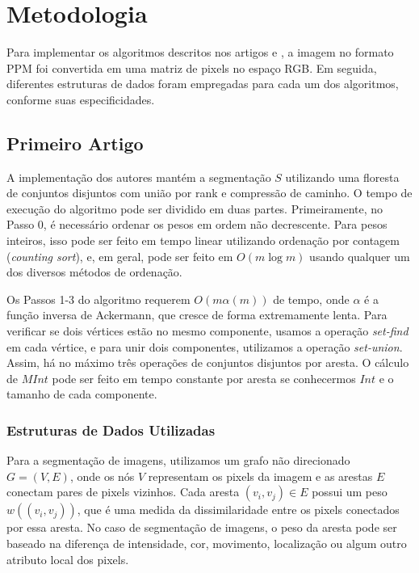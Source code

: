 \documentclass[12pt]{article}
\begin{document}
\section{Metodologia}
Para implementar os algoritmos descritos nos artigos \cite{boykov2006graph} e \cite{felzenszwalb2004efficient}, a imagem no formato PPM foi convertida em uma matriz de pixels no espaço RGB. Em seguida, diferentes estruturas de dados foram empregadas para cada um dos algoritmos, conforme suas especificidades. 

\subsection{Primeiro Artigo}

A implementação dos autores \cite{felzenszwalb2004efficient} mantém a segmentação \( S \) utilizando uma floresta de conjuntos disjuntos com união por rank e compressão de caminho. O tempo de execução do algoritmo pode ser dividido em duas partes. Primeiramente, no Passo 0, é necessário ordenar os pesos em ordem não decrescente. Para pesos inteiros, isso pode ser feito em tempo linear utilizando ordenação por contagem (\textit{counting sort}), e, em geral, pode ser feito em \( O(m \log m) \) usando qualquer um dos diversos métodos de ordenação.

Os Passos 1-3 do algoritmo requerem \( O(m \alpha(m)) \) de tempo, onde \( \alpha \) é a função inversa de Ackermann, que cresce de forma extremamente lenta. Para verificar se dois vértices estão no mesmo componente, usamos a operação \textit{set-find} em cada vértice, e para unir dois componentes, utilizamos a operação \textit{set-union}. Assim, há no máximo três operações de conjuntos disjuntos por aresta. O cálculo de \( MInt \) pode ser feito em tempo constante por aresta se conhecermos \( Int \) e o tamanho de cada componente.

\subsubsection{Estruturas de Dados Utilizadas}

Para a segmentação de imagens, utilizamos um grafo não direcionado \( G = (V, E) \), onde os nós \( V \) representam os pixels da imagem e as arestas \( E \) conectam pares de pixels vizinhos. Cada aresta \( (v_i, v_j) \in E \) possui um peso \( w((v_i, v_j)) \), que é uma medida da dissimilaridade entre os pixels conectados por essa aresta. No caso de segmentação de imagens, o peso da aresta pode ser baseado na diferença de intensidade, cor, movimento, localização ou algum outro atributo local dos pixels.
\end{document}
